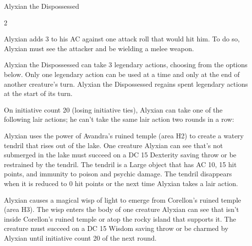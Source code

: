 \documentclass[10pt,a4paper,twoside,bg=none,twocolumn,openany,nodeprecatedcode]{dndbook}
\begin{document}
\begin{DndMonster}[float*=b,width=\textwidth + 8pt]{Alyxian the Dispossessed}
\begin{multicols}{2}
\par
{}
Alyxian adds 3 to his AC against one attack roll that would hit him. To do so, Alyxian must see the attacker and be wielding a melee weapon.

\par
{}
Alyxian the Dispossessed can take 3 legendary actions, choosing from the options below. Only one legendary action can be used at a time and only at the end of another creature's turn. Alyxian the Dispossessed regains spent legendary actions at the start of its turn.

\begin{DndMonsterLegendaryActions}
\end{DndMonsterLegendaryActions}
\par {}
On initiative count 20 (losing initiative ties), Alyxian can take one of the following lair actions; he can't take the same lair action two rounds in a row:


\begin{description}[nolistsep]
\item[Avandra's Grasp]
Alyxian uses the power of Avandra's ruined temple (area H2) to create a watery tendril that rises out of the lake. One creature Alyxian can see that's not submerged in the lake must succeed on a DC 15 Dexterity saving throw or be restrained by the tendril. The tendril is a Large object that has AC 10, 15 hit points, and immunity to poison and psychic damage. The tendril disappears when it is reduced to 0 hit points or the next time Alyxian takes a lair action.

\item[Corellon's Charm]
Alyxian causes a magical wisp of light to emerge from Corellon's ruined temple (area H3). The wisp enters the body of one creature Alyxian can see that isn't inside Corellon's ruined temple or atop the rocky island that supports it. The creature must succeed on a DC 15 Wisdom saving throw or be charmed by Alyxian until initiative count 20 of the next round.


\end{description}
\end{multicols}
\end{DndMonster}
\end{document}

